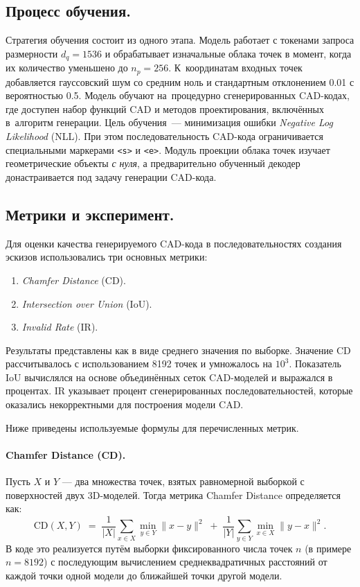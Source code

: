 \subsection{Процесс обучения.}
Стратегия обучения состоит из одного этапа. Модель работает с токенами запроса
размерности $d_q = 1536$ и обрабатывает изначальные облака точек в момент,
когда их количество уменьшено до $n_p = 256$. К~координатам входных точек
добавляется гауссовский шум со средним ноль и стандартным отклонением 0.01 с
вероятностью 0.5. Модель обучают на~процедурно сгенерированных CAD-кодах, где
доступен набор функций CAD и методов проектирования, включённых в~алгоритм
генерации. Цель обучения~--- минимизация ошибки \emph{Negative Log Likelihood}
(NLL). При этом последовательность CAD-кода ограничивается специальными
маркерами \texttt{<s>} и \texttt{<e>}. Модуль проекции облака точек изучает
геометрические объекты \emph{с нуля}, а предварительно обученный декодер
донастраивается под задачу генерации CAD-кода.

\subsection{Метрики и эксперимент.}
Для оценки качества генерируемого CAD-кода в последовательностях создания
эскизов использовались три основных метрики:
\begin{enumerate}
    \item \emph{Chamfer Distance} (CD).
    \item \emph{Intersection over Union} (IoU).
    \item \emph{Invalid Rate} (IR).
\end{enumerate}

Результаты представлены как в виде среднего значения по выборке.
Значение CD рассчитывалось с использованием 8192 точек и умножалось на \(10^3\).
Показатель IoU вычислялся на основе объединённых сеток CAD-моделей и выражался
в процентах. IR указывает процент сгенерированных последовательностей,
которые оказались некорректными для построения модели CAD.

Ниже приведены используемые формулы для перечисленных метрик.

\paragraph{Chamfer Distance (CD).}
Пусть \( X \) и \( Y \) --- два множества точек, взятых равномерной выборкой
с поверхностей двух 3D-моделей. Тогда метрика Chamfer Distance определяется как:
\[
    \mathrm{CD}(X, Y) \;=\; \frac{1}{|X|}\sum_{x\in X}\min_{y\in Y}\|x - y\|^2
    \;+\;
    \frac{1}{|Y|}\sum_{y\in Y}\min_{x\in X}\|y - x\|^2.
\]
В коде это реализуется путём выборки фиксированного числа точек \(n\) (в примере \(n = 8192\))
с последующим вычислением среднеквадратичных расстояний от каждой точки одной модели
до ближайшей точки другой модели.

